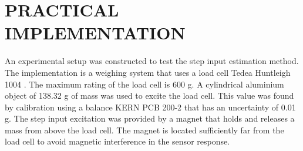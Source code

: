 


\section{PRACTICAL IMPLEMENTATION} 
An experimental setup was constructed to test the step input estimation method.
The implementation is a weighing system that uses a load cell Tedea Huntleigh 1004 \cite{tedea1004}.
The maximum rating of the load cell is 600 g.
A cylindrical aluminium object of 138.32 g of mass was used to excite the load cell.
This value was found by calibration using a balance KERN PCB 200-2 that has an uncertainty of 0.01 g.
The step input excitation was provided by a magnet that holds and releases a mass from above the load cell.
The magnet is located sufficiently far from the load cell to avoid magnetic interference in the sensor response.

